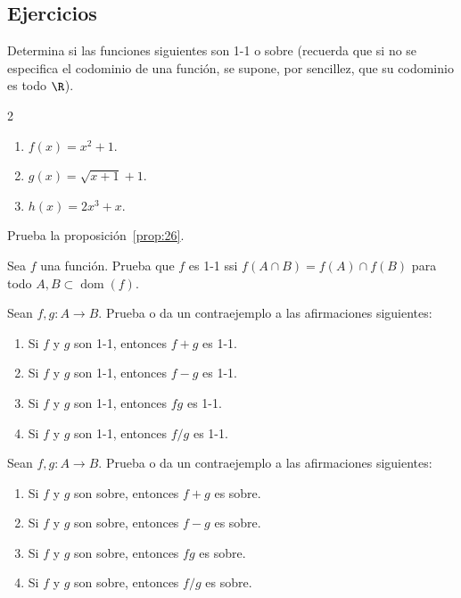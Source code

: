 \documentclass[12pt,a4paper]{book}
\DeclareMathOperator{\dom}{dom}
\begin{document}
    \par{}\subsection*{Ejercicios}

    \begin{ejercicio}\label{ej:114}
        Determina si las funciones siguientes son 1-1 o sobre (recuerda
        que si no se especifica el codominio de una función, se supone, por sencillez,
        que su codominio es todo $\R$).
        \begin{multicols}{2}
        \begin{enumerate}[nosep]
            \item $f(x)=x^{2}+1$.
            \item $g(x)=\sqrt{x+1}+1$.
            \item $h(x)=2x^{3}+x$.
        \end{enumerate}
        \end{multicols}
    \end{ejercicio}

    \begin{ejercicio}\label{ej:115}
        Prueba la proposición~\ref{prop:26}.
    \end{ejercicio}

    \begin{ejercicio}\label{ej:116}
        Sea $f$ una función. Prueba que $f$ es 1-1 ssi $f(A\cap B)=
        f(A)\cap f(B)$ para todo $A,B\subset\dom(f)$.
    \end{ejercicio}

    \begin{ejercicio}\label{ej:117}
        Sean $f,g:A\to B$. Prueba o da un contraejemplo a las
        afirmaciones siguientes:
        \begin{enumerate}[nosep]
            \item Si $f$ y $g$ son 1-1, entonces $f+g$ es 1-1.
            \item Si $f$ y $g$ son 1-1, entonces $f-g$ es 1-1.
            \item Si $f$ y $g$ son 1-1, entonces $fg$ es 1-1.
            \item Si $f$ y $g$ son 1-1, entonces $f/g$ es 1-1.
        \end{enumerate}
    \end{ejercicio}

    \begin{ejercicio}\label{ej:118}
        Sean $f,g:A\to B$. Prueba o da un contraejemplo a las
        afirmaciones siguientes:
        \begin{enumerate}[nosep]
            \item Si $f$ y $g$ son sobre, entonces $f+g$ es sobre.
            \item Si $f$ y $g$ son sobre, entonces $f-g$ es sobre.
            \item Si $f$ y $g$ son sobre, entonces $fg$ es sobre.
            \item Si $f$ y $g$ son sobre, entonces $f/g$ es sobre.
        \end{enumerate}
    \end{ejercicio}
\end{document}
